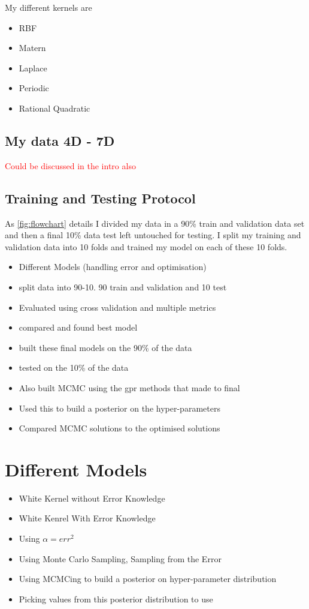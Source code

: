 \documentclass{article}
\begin{document}
My different kernels are
\begin{itemize}
    \item RBF
    \item Matern
    \item Laplace
    \item Periodic
    \item Rational Quadratic
\end{itemize}

\subsection{My data 4D - 7D}
\textcolor{red}{Could be discussed in the intro also}
\subsection{Training and Testing Protocol}
As \ref{fig:flowchart} details I divided my data in a 90\% train and validation data set and then a final 10\% data test left untouched for testing.
I split my training and validation data into 10 folds and trained my model on each of these 10 folds. 



\begin{itemize}
    \item Different Models (handling error and optimisation)
    \item split data into 90-10. 90 train and validation and 10 test
    \item Evaluated using cross validation and multiple metrics
    \item compared and found best model
    \item built these final models on the 90\% of the data
    \item tested on the 10\% of the data
    \item Also built MCMC using the gpr methods that made to final
    \item Used this to build a posterior on the hyper-parameters
    \item Compared MCMC solutions to the optimised solutions
\end{itemize}

\section{Different Models}
\begin{itemize}
    \item White Kernel without Error Knowledge
    \item White Kenrel With Error Knowledge
    \item Using $\alpha = err^2$
    \item Using Monte Carlo Sampling, Sampling from the Error
    \item Using MCMCing to build a posterior on hyper-parameter distribution
    \item Picking values from this posterior distribution to use
\end{itemize}


\printbibliography
\end{document}
